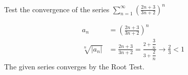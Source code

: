   \begin{example}
    Test the convergence of the series $\displaystyle \sum_{n=1}^{\infty} \left(\frac{2n+3}{3n+2}\right)^n$
  \end{example}
  \begin{solution}
    \begin{align*}
      a_n &= \left(\frac{2n+3}{3n+2}\right)^n \\
      \sqrt[n]{|a_n|} &= \frac{2n+3}{3n+2} = \frac{2 + \dfrac{3}{n}}{3 + \dfrac{2}{n}} \to \frac{2}{3} < 1
    \end{align*}
    The given series converges by the Root Test.
  \end{solution}

